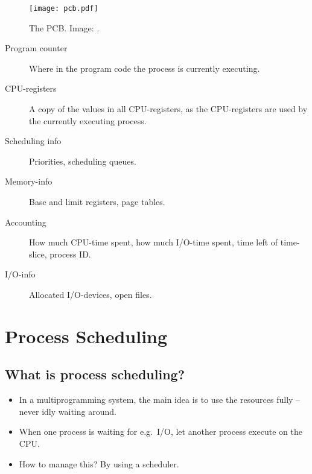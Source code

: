 \documentclass{beamer}
\begin{document}
\begin{frame}{\insertsubsectionhead}
  \begin{figure}
    \texttt{[image: pcb.pdf]}
    \caption{The PCB.
      Image: \cite{Silberschatz2009osc}.}
  \end{figure}
\end{frame}

\begin{frame}{\insertsubsectionhead}
  \begin{description}
    \item[Program counter] Where in the program code the process is currently 
      executing.

    \item[CPU-registers] A copy of the values in all CPU-registers, as the 
      CPU-registers are used by the currently executing process.

    \item[Scheduling info] Priorities, scheduling queues.

    \item[Memory-info] Base and limit registers, page tables.

    \item[Accounting] How much CPU-time spent, how much I/O-time spent, time 
      left of time-slice, process ID.

    \item[I/O-info] Allocated I/O-devices, open files.
  \end{description}
\end{frame}

\section[Scheduling]{Process Scheduling}

\subsection{What is process scheduling?}

\begin{frame}{\insertsubsectionhead}
  \begin{itemize}
    \item In a multiprogramming system, the main idea is to use the resources 
      fully -- never idly waiting around.

    \item When one process is waiting for e.g.\ I/O, let another process 
      execute on the CPU.

    \item How to manage this?
      By using a scheduler.
  \end{itemize}
\end{frame}
\end{document}
